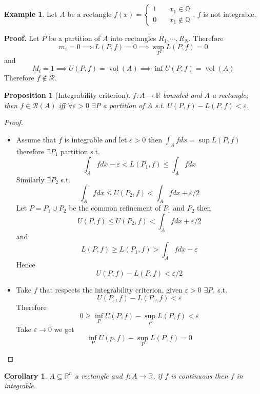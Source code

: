 \documentclass[11pt,a4paper]{article}
\theoremstyle{definition}
\newtheorem{example}[definition]{Example}
\theoremstyle{plain}
\newtheorem{proposition}[definition]{Proposition}
\newtheorem{corollary}[definition]{Corollary}
\theoremstyle{remark}
\newcommand{\R}{\mathbb{R}}
\newcommand{\Q}{\mathbb{Q}}
\newcommand{\vol}{\operatorname{vol}}
\begin{document}
\begin{example}
    Let $A$ be a rectangle $f(x) = \begin{cases}
        1 \quad& x_1 \in \Q \\
        0 \quad &x_1 \not\in \Q
    \end{cases}$, $f$ is not integrable. 

    \textbf{Proof.} Let $P$ be a partition of $A$ into rectangles $R_1, \cdots, R_N$. 
    Therefore 
    $$m_i = 0 \implies L(P, f) = 0 \implies \sup_P L(P, f) = 0$$
    and 
    $$M_i = 1 \implies U(P,f) = \vol (A) \implies \inf U(P,f) = \vol (A)$$
    Therefore $f \not\in \mathcal{R}$. 
\end{example}

\begin{proposition}[Integrability criterion]
    $f \colon A \to \R$ bounded and $A$ a rectangle; then $f \in \mathcal{R}(A)$ iff 
$\forall \varepsilon > 0$ $\exists P$ a partition of $A$ s.t. $U(P,f) - L(P, f) < \varepsilon$. 
\end{proposition}

\begin{proof}
    \begin{itemize}
        \item[$\implies$] Assume that $f$ is integrable and let $\varepsilon > 0$ then 
        $\int_A f dx = \sup L(P, f)$ therefore $\exists P_1$ partition s.t. 
        $$\int_A f dx - \varepsilon < L(P_1, f) \le \int_A f dx$$
        Similarly $\exists P_2$ s.t. 
        $$\int_A f dx \le U(P_2, f) < \int_A f dx + \varepsilon/2$$
        Let $P = P_1 \cup P_2$ be the common refinement of $P_1$ and $P_2$ then 
        $$U(P, f) \le U(P_2, f) < \int_A f dx + \varepsilon/2$$
        and 
        $$L(P, f) \ge L(P_1, f) > \int_A f dx - \varepsilon$$
        Hence 
        $$U(P,f) - L(P,f) <\varepsilon/2$$

        \item[$\impliedby$] Take $f$ that respects the integrability criterion, given $\varepsilon > 0$ $\exists P_\varepsilon$ s.t. 
        $$U(P_\varepsilon, f) - L(P_\varepsilon, f) < \varepsilon$$
        Therefore 
        $$0 \ge \inf_P U(P, f) - \sup_P L(P,f) < \varepsilon$$
        Take $\varepsilon \to 0$ we get 
        $$\inf_P U(p,f) - \sup_P L(P,f) = 0$$
    \end{itemize}
\end{proof}

\begin{corollary}
    $A \subseteq \R^n$ a rectangle and $f \colon A \to \R$, if $f$ is continuous then $f$ in integrable. 
\end{corollary}
\end{document}
